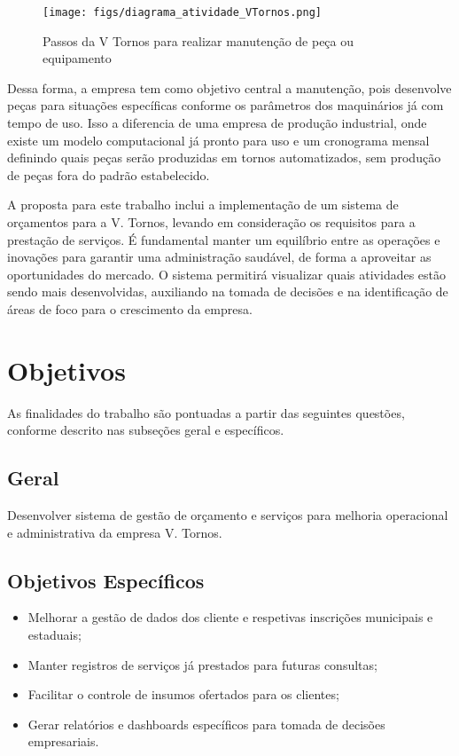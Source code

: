 \begin{figure}[htb!]
    \centering
    \texttt{[image: figs/diagrama\_atividade\_VTornos.png]}
    \caption{Passos da V Tornos para realizar manutenção de peça ou equipamento}
    \label{fig:diagrama_VTornos}
\end{figure}

Dessa forma, a empresa tem como objetivo central a manutenção, pois desenvolve peças para situações específicas conforme os parâmetros dos maquinários já com tempo de uso. Isso a diferencia de uma empresa de produção industrial, onde existe um modelo computacional já pronto para uso e um cronograma mensal definindo quais peças serão produzidas em tornos automatizados, sem produção de peças fora do padrão estabelecido.

A proposta para este trabalho inclui a implementação de um sistema de orçamentos para a V. Tornos, levando em consideração os requisitos para a prestação de serviços. É fundamental manter um equilíbrio entre as operações e inovações para garantir uma administração saudável, de forma a aproveitar as oportunidades do mercado. O sistema permitirá visualizar quais atividades estão sendo mais desenvolvidas, auxiliando na tomada de decisões e na identificação de áreas de foco para o crescimento da empresa.

\section{Objetivos}

As finalidades do trabalho são pontuadas a partir das seguintes questões, conforme descrito nas subseções geral e específicos.

\subsection{Geral}\label{sec:objGeral}

Desenvolver sistema de gestão de orçamento e serviços para melhoria operacional e administrativa da empresa V. Tornos.

\subsection{Objetivos Específicos}\label{sec:objEspc}

\begin{itemize}
   \item Melhorar a gestão de dados dos cliente e respetivas inscrições municipais e estaduais;
   \item Manter registros de serviços já prestados para futuras consultas;
   \item Facilitar o controle de insumos ofertados para os clientes;
   \item  Gerar relatórios e dashboards específicos para tomada de decisões empresariais.
\end{itemize}